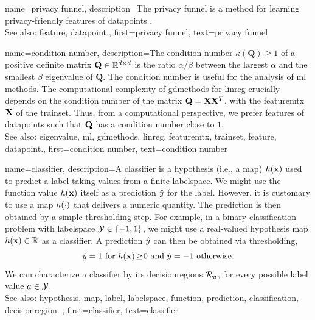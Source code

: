 {name={privacy funnel},
	description={The privacy funnel is a method for learning privacy-friendly \glspl{feature} 
		of \glspl{datapoint} \cite{PrivacyFunnel}.
				\\ 
		See also: \gls{feature}, \gls{datapoint}.},
 	first={privacy funnel},
	text={privacy funnel} 
}


{name={condition number},
	description={The condition number $\kappa(\mathbf{Q}) \geq 1$ of a 
		positive definite 
		matrix $\mathbf{Q} \in \mathbb{R}^{d \times d}$ is the ratio 
		$\alpha /\beta  $ between the 
		largest $\alpha$ and the smallest $\beta$ \gls{eigenvalue} of 
		$\mathbf{Q}$. The condition number is useful for the analysis of \gls{ml} methods. 
		The computational complexity of \gls{gdmethods} for \gls{linreg} crucially depends on the 
		condition number of the matrix $\mathbf{Q} = {\bf X} {\bf X}^{T}$, with the \gls{featuremtx} ${\bf X}$ 
		of the \gls{trainset}. Thus, from a computational perspective, we prefer \glspl{feature} of 
		\glspl{datapoint} such that $\mathbf{Q}$ has a condition number close to $1$.
					\\ 
		See also: \gls{eigenvalue}, \gls{ml}, \gls{gdmethods}, \gls{linreg}, \gls{featuremtx}, \gls{trainset}, \gls{feature}, \gls{datapoint}.},
	first={condition number},
	text={condition number} 
}

{name={classifier},
	description={A classifier is a \gls{hypothesis} (i.e., a \gls{map}) $h({\bf x})$ 
		used to predict a \gls{label} taking values from a finite \gls{labelspace}. We might use the 
		\gls{function} value $h({\bf x})$ itself as a \gls{prediction} $\hat{y}$ for 
		the \gls{label}. However, it is customary to use a \gls{map} $h(\cdot)$ that delivers 
		a numeric quantity. The \gls{prediction} is then obtained by a simple thresholding step. 
		For example, in a binary \gls{classification} problem with \gls{labelspace} $\mathcal{Y} \in  \{ -1,1\}$, 
		we might use a real-valued \gls{hypothesis} \gls{map} $h({\bf x}) \in \mathbb{R}$ 
		as a classifier. A \gls{prediction} $\hat{y}$ can then be obtained via thresholding,  
		 \begin{equation} 
		 	\label{equ_def_threshold_bin_classifier_dict}
		 	\hat{y} =1   \mbox{ for } h({\bf x})\!\geq\!0 \mbox{ and } 	\hat{y} =-1  \mbox{ otherwise.}
	 		\end{equation}
 		We can characterize a classifier by its \glspl{decisionregion} $\mathcal{R}_{a}$, for 
 		every possible \gls{label} value $a \in \mathcal{Y}$.
					\\ 
		See also: \gls{hypothesis}, \gls{map}, \gls{label}, \gls{labelspace}, \gls{function}, \gls{prediction}, \gls{classification}, \gls{decisionregion}. },
	first={classifier},
	text={classifier} 
}

